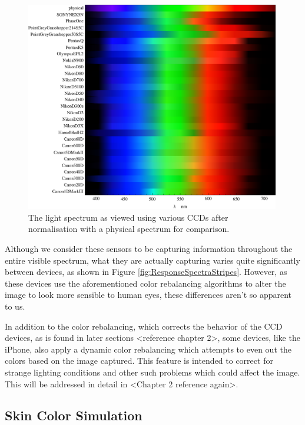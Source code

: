\begin{figure}[h!]
  \centering
    \includegraphics[width=0.99\textwidth]{Chapter1/Figs/ResponseSpectraStripesNorm.eps}
    \caption{The light spectrum as viewed using various CCDs after normalisation with a physical spectrum for comparison.}  \label{fig:ResponseSpectraStripesNorm}
\end{figure}

Although we consider these sensors to be capturing information throughout the entire visible spectrum, what they are actually capturing varies quite significantly between devices, as shown in Figure \ref{fig:ResponseSpectraStripes}. However, as these devices use the aforementioned color rebalancing algorithms to alter the image to look more sensible to human eyes, these differences aren't so apparent to us.

In addition to the color rebalancing, which corrects the behavior of the CCD devices, as is found in later sections <reference chapter 2>, some devices, like the iPhone, also apply a dynamic color rebalancing which attempts to even out the colors based on the image captured. This feature is intended to correct for strange lighting conditions and other such problems which could affect the image. This will be addressed in detail in <Chapter 2 reference again>.


\subsection{Skin Color Simulation} \label{sec:SkinColorSimulation}


